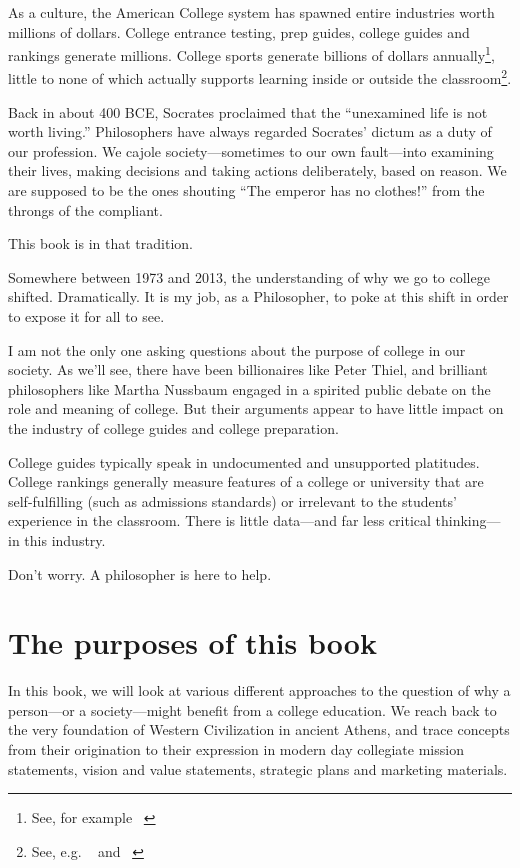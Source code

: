 As a culture, the American College system has spawned entire industries worth millions of dollars. College entrance testing, prep guides, college guides and rankings generate millions. College sports generate billions of dollars annually\footnote{See, for example ~\citep{Humphreys:2008wr}}, little to none of which actually supports learning inside or outside the classroom\footnote{See, e.g. ~\citep{DavidWelchSuggs:2012wf} and ~\citep{Wolverton:2015uy}}. 

Back in about 400 BCE, Socrates proclaimed that the ``unexamined life is not worth living.'' Philosophers have always regarded Socrates' dictum as a duty of our profession. We cajole society---sometimes to our own fault---into examining their lives, making decisions and taking actions deliberately, based on reason. We are supposed to be the ones shouting ``The emperor has no clothes!'' from the throngs of the compliant. 

This book is in that tradition. 

Somewhere between 1973 and 2013, the understanding of why we go to college shifted. Dramatically. It is my job, as a Philosopher, to poke at this shift in order to expose it for all to see.

I am not the only one asking questions about the purpose of college in our society. As we'll see, there have been billionaires like Peter Thiel, and brilliant philosophers like Martha Nussbaum engaged in a spirited public debate on the role and meaning of college. But their arguments appear to have little impact on the industry of college guides and college preparation.

College guides typically speak in undocumented and unsupported platitudes. College rankings generally measure features of a college or university that are self-fulfilling (such as admissions standards) or irrelevant to the students' experience in the classroom. There is little data---and far less critical thinking---in this industry.

Don't worry. A philosopher is here to help.

\section*{The purposes of this book} 

In this book, we will look at various different approaches to the question of why a person---or a society---might benefit from a college education. We reach back to the very foundation of Western Civilization in ancient Athens, and trace concepts from their origination to their expression in modern day collegiate mission statements, vision and value statements, strategic plans and marketing materials.

